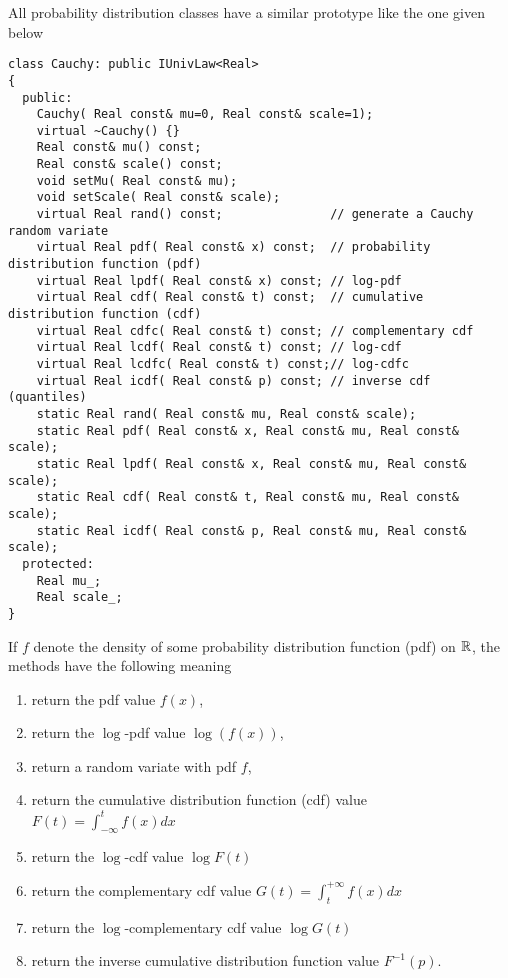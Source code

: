 \documentclass[a4paper,10pt]{article}
\begin{document}
All probability distribution classes have a similar prototype like the one given
below
\begin{lstlisting}[style=customcpp,caption=Prototype of probability distribution class (example taken from Cauchy class)]
class Cauchy: public IUnivLaw<Real>
{
  public:
    Cauchy( Real const& mu=0, Real const& scale=1);
    virtual ~Cauchy() {}
    Real const& mu() const;
    Real const& scale() const;
    void setMu( Real const& mu);
    void setScale( Real const& scale);
    virtual Real rand() const;               // generate a Cauchy random variate
    virtual Real pdf( Real const& x) const;  // probability distribution function (pdf)
    virtual Real lpdf( Real const& x) const; // log-pdf
    virtual Real cdf( Real const& t) const;  // cumulative distribution function (cdf)
    virtual Real cdfc( Real const& t) const; // complementary cdf
    virtual Real lcdf( Real const& t) const; // log-cdf
    virtual Real lcdfc( Real const& t) const;// log-cdfc
    virtual Real icdf( Real const& p) const; // inverse cdf (quantiles)
    static Real rand( Real const& mu, Real const& scale);
    static Real pdf( Real const& x, Real const& mu, Real const& scale);
    static Real lpdf( Real const& x, Real const& mu, Real const& scale);
    static Real cdf( Real const& t, Real const& mu, Real const& scale);
    static Real icdf( Real const& p, Real const& mu, Real const& scale);
  protected:
    Real mu_;
    Real scale_;
}
\end{lstlisting}
If $f$ denote the density of some probability distribution function (pdf) on $\mathbb{R}$,
the methods have the following meaning
\begin{enumerate}
\item {} return the pdf value $f(x)$,
\item {} return the $\log$-pdf value $\log(f(x))$,
\item {} return a random variate with pdf $f$,
\item {} return the cumulative distribution function (cdf) value
$F(t)=\int_{-\infty}^t f(x) dx$
\item {} return the $\log$-cdf value $\log F(t)$
\item {} return the complementary cdf value $G(t)=\int_t^{+\infty}
f(x) dx$
\item {} return the  $\log$-complementary cdf value $\log G(t)$
\item {} return the inverse cumulative distribution function value $F^{-1}(p)$.
\end{enumerate}
\end{document}
